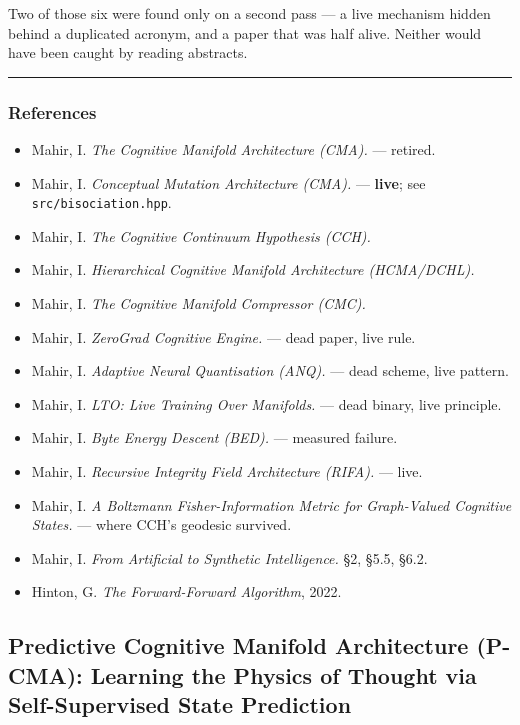\documentclass[
  11pt,
  a4paper,
]{article}
\providecommand{\tightlist}{%
  \setlength{\itemsep}{0pt}\setlength{\parskip}{0pt}}
\begin{document}
Two of those six were found only on a second pass --- a live mechanism
hidden behind a duplicated acronym, and a paper that was half alive.
Neither would have been caught by reading abstracts.

\begin{center}\rule{0.5\linewidth}{0.5pt}\end{center}

\subsubsection{References}\label{references}

\begin{itemize}
\tightlist
\item
  Mahir, I. \emph{The Cognitive Manifold Architecture (CMA).} ---
  retired.
\item
  Mahir, I. \emph{Conceptual Mutation Architecture (CMA).} ---
  \textbf{live}; see \texttt{src/bisociation.hpp}.
\item
  Mahir, I. \emph{The Cognitive Continuum Hypothesis (CCH).}
\item
  Mahir, I. \emph{Hierarchical Cognitive Manifold Architecture
  (HCMA/DCHL).}
\item
  Mahir, I. \emph{The Cognitive Manifold Compressor (CMC).}
\item
  Mahir, I. \emph{ZeroGrad Cognitive Engine.} --- dead paper, live rule.
\item
  Mahir, I. \emph{Adaptive Neural Quantisation (ANQ).} --- dead scheme,
  live pattern.
\item
  Mahir, I. \emph{LTO: Live Training Over Manifolds.} --- dead binary,
  live principle.
\item
  Mahir, I. \emph{Byte Energy Descent (BED).} --- measured failure.
\item
  Mahir, I. \emph{Recursive Integrity Field Architecture (RIFA).} ---
  live.
\item
  Mahir, I. \emph{A Boltzmann Fisher-Information Metric for Graph-Valued
  Cognitive States.} --- where CCH's geodesic survived.
\item
  Mahir, I. \emph{From Artificial to Synthetic Intelligence.} §2, §5.5,
  §6.2.
\item
  Hinton, G. \emph{The Forward-Forward Algorithm}, 2022.
\end{itemize}

\newpage

\subsection{Predictive Cognitive Manifold Architecture (P-CMA): Learning
the Physics of Thought via Self-Supervised State
Prediction}\label{predictive-cognitive-manifold-architecture-p-cma-learning-the-physics-of-thought-via-self-supervised-state-prediction}
\end{document}
